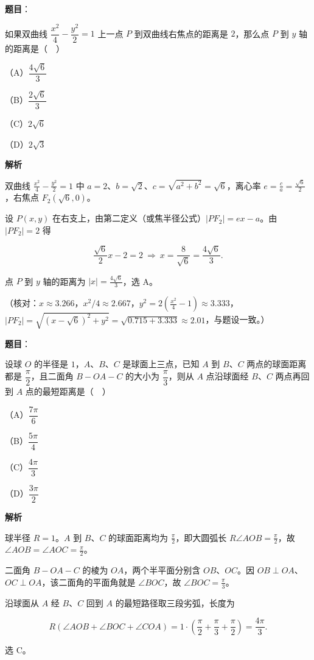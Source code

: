 \begin{answer}

\textbf{题目}：

如果双曲线 $\dfrac{x^2}{4}-\dfrac{y^2}{2}=1$ 上一点 $P$ 到双曲线右焦点的距离是 $2$，那么点 $P$ 到 $y$ 轴的距离是（　）

（A）$\dfrac{4\sqrt6}{3}$

（B）$\dfrac{2\sqrt6}{3}$

（C）$2\sqrt6$

（D）$2\sqrt3$

\textbf{解析}

双曲线 $\frac{x^2}{4}-\frac{y^2}{2}=1$ 中 $a=2$、$b=\sqrt2$、$c=\sqrt{a^2+b^2}=\sqrt6$，离心率 $e=\frac ca=\frac{\sqrt6}{2}$，右焦点 $F_2(\sqrt6,0)$。

设 $P(x,y)$ 在右支上，由第二定义（或焦半径公式）$|PF_2|=ex-a$。由 $|PF_2|=2$ 得

\nopagebreak[4]
\[\frac{\sqrt6}{2}x-2=2\ \Longrightarrow\ x=\frac{8}{\sqrt6}=\frac{4\sqrt6}{3}.\]

点 $P$ 到 $y$ 轴的距离为 $|x|=\frac{4\sqrt6}{3}$，选 A。

（核对：$x\approx3.266$，$x^2/4\approx2.667$，$y^2=2\left(\frac{x^2}{4}-1\right)\approx3.333$，$|PF_2|=\sqrt{(x-\sqrt6)^2+y^2}=\sqrt{0.715+3.333}\approx2.01$，与题设一致。）


\end{answer}
\begin{answer}

\textbf{题目}：

设球 $O$ 的半径是 $1$，$A$、$B$、$C$ 是球面上三点，已知 $A$ 到 $B$、$C$ 两点的球面距离都是 $\dfrac{\pi}{2}$，且二面角 $B-OA-C$ 的大小为 $\dfrac{\pi}{3}$，则从 $A$ 点沿球面经 $B$、$C$ 两点再回到 $A$ 点的最短距离是（　）
\nopagebreak[4]
\begin{center}\end{center}
\nopagebreak[4]
（A）$\dfrac{7\pi}{6}$

（B）$\dfrac{5\pi}{4}$

（C）$\dfrac{4\pi}{3}$

（D）$\dfrac{3\pi}{2}$

\textbf{解析}

球半径 $R=1$。$A$ 到 $B$、$C$ 的球面距离均为 $\frac{\pi}{2}$，即大圆弧长 $R\angle AOB=\frac{\pi}{2}$，故 $\angle AOB=\angle AOC=\frac{\pi}{2}$。

二面角 $B-OA-C$ 的棱为 $OA$，两个半平面分别含 $OB$、$OC$。因 $OB\perp OA$、$OC\perp OA$，该二面角的平面角就是 $\angle BOC$，故 $\angle BOC=\frac{\pi}{3}$。

沿球面从 $A$ 经 $B$、$C$ 回到 $A$ 的最短路径取三段劣弧，长度为

\nopagebreak[4]
\[R\left(\angle AOB+\angle BOC+\angle COA\right)=1\cdot\left(\frac{\pi}{2}+\frac{\pi}{3}+\frac{\pi}{2}\right)=\frac{4\pi}{3}.\]

选 C。


\end{answer}
